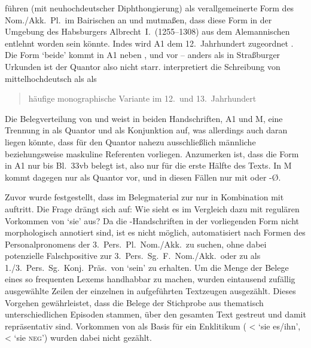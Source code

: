 \citet[396--397]{ksw2} führen  (mit
neuhochdeutscher Diphthongierung) als ver\-all\-gemeinerte
Form des Nom./Akk.\ Pl.\ im Bairischen an und
mutmaßen, dass diese Form in der Umgebung des Habsburgers Albrecht~I.\
(1255--1308) aus dem Alemannischen entlehnt worden
sein könnte. Indes wird A1 dem 12.~Jahrhundert zugeordnet
\autocite{kcdigital,wolf:kckat}. Die Form  `beide' kommt in A1 neben
\lit{bediu}, \lit{bæde} und \lit{bædiu} vor -- anders als in Straßburger
Urkunden ist der Quantor also nicht starr. \citeauthor{wiesinger2001}
interpretiert die Schreibung von mittelhochdeutsch
\norm{ėi} als \lit{e} als \blockcquote[103]{wiesinger2001}{häufige
mono\-graphische Variante \textelp{} im 12.\ und 13.~Jahrhundert}.

Die Belegverteilung von  und  weist in beiden
Handschriften, A1 und M, eine Trennung in \norm{bėide} als Quantor und
\norm{bėidiu} als Konjunktion auf, was allerdings auch daran liegen könnte,
dass für den Quantor nahezu ausschließlich männliche beziehungsweise maskuline
Referenten vorliegen. Anzumerken ist, dass die Form  in A1 nur bis
Bl.~33vb belegt ist, also nur für die erste Hälfte des Texts. In M kommt
\norm{bed-} dagegen nur als Quantor vor, und in diesen Fällen nur mit 
oder -Ø.

Zuvor wurde festgestellt, dass im Belegmaterial zur \KC{} nur
 in Kombination mit  auftritt. Die Frage drängt sich
auf: Wie sieht es im Vergleich dazu mit regulären Vorkommen von `sie' aus? Da
die \KC{}-Hand\-schrif\-ten in der vorliegenden Form nicht morphologisch
annotiert sind, ist es nicht möglich, automatisiert nach Formen des
Personal\-pronomens der 3.~Pers.\ Pl.\ Nom./Akk.\ zu suchen, ohne dabei
potenzielle Falschpositive zur 3.~Pers.\ Sg.~F.\ Nom./Akk.\ oder zu 
als 1./3.~Pers.\ Sg.\ Konj.\ Präs.\ von \norm{sīn} `sein' zu erhalten. Um die
Menge der Belege eines so frequenten Lexems handhabbar zu machen, wurden
eintausend zufällig ausgewählte Zeilen der einzelnen in 
aufgeführten Textzeugen ausgezählt. Dieses Vorgehen gewährleistet, dass die
Belege der Stichprobe aus thematisch unterschiedlichen Episoden stammen, über
den gesamten Text gestreut und damit repräsentativ sind. Vorkommen von
\norm{si} als Basis für ein Enklitikum (\norm{siȥ/-n} < \norm{si eȥ/in} `sie
es/ihn',  < \norm{si ne} `sie \textsc{neg}') wurden dabei nicht
gezählt.

